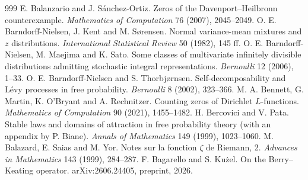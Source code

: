 \begin{thebibliography}{999}
 E. Balanzario and J. S\'anchez-Ortiz. Zeros of the Davenport--Heilbronn counterexample. \emph{Mathematics of Computation} 76 (2007), 2045--2049.
 O. E. Barndorff-Nielsen, J. Kent and M. S{\o}rensen. Normal variance-mean mixtures and $z$ distributions. \emph{International Statistical Review} 50 (1982), 145 ff.
 O. E. Barndorff-Nielsen, M. Maejima and K. Sato. Some classes of multivariate infinitely divisible distributions admitting stochastic integral representations. \emph{Bernoulli} 12 (2006), 1--33.
 O. E. Barndorff-Nielsen and S. Thorbj{\o}rnsen. Self-decomposability and L\'evy processes in free probability. \emph{Bernoulli} 8 (2002), 323--366.
 M. A. Bennett, G. Martin, K. O'Bryant and A. Rechnitzer. Counting zeros of Dirichlet $L$-functions. \emph{Mathematics of Computation} 90 (2021), 1455--1482.
 H. Bercovici and V. Pata. Stable laws and domains of attraction in free probability theory (with an appendix by P. Biane). \emph{Annals of Mathematics} 149 (1999), 1023--1060.
 M. Balazard, E. Saias and M. Yor. Notes sur la fonction $\zeta$ de Riemann, 2. \emph{Advances in Mathematics} 143 (1999), 284--287.
 F. Bagarello and S. Ku\.{z}el. On the Berry--Keating operator. arXiv:2606.24405, preprint, 2026.

\end{thebibliography}
